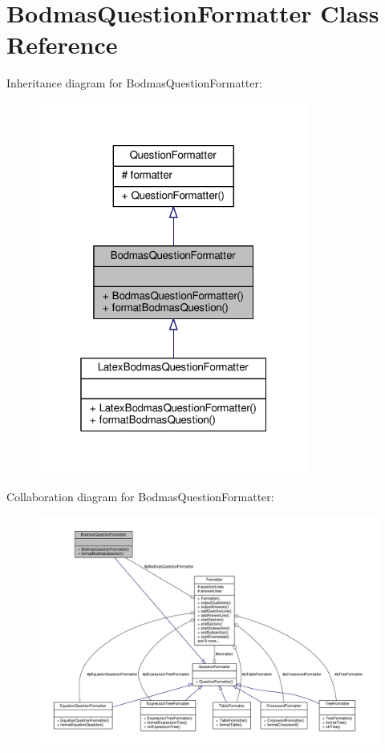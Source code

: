 \hypertarget{classBodmasQuestionFormatter}{}\section{Bodmas\+Question\+Formatter Class Reference}
\label{classBodmasQuestionFormatter}


Inheritance diagram for Bodmas\+Question\+Formatter\+:
\nopagebreak
\begin{figure}[H]
\begin{center}
\leavevmode
\includegraphics[width=253pt]{classBodmasQuestionFormatter__inherit__graph}
\end{center}
\end{figure}


Collaboration diagram for Bodmas\+Question\+Formatter\+:
\nopagebreak
\begin{figure}[H]
\begin{center}
\leavevmode
\includegraphics[width=350pt]{classBodmasQuestionFormatter__coll__graph}
\end{center}
\end{figure}
